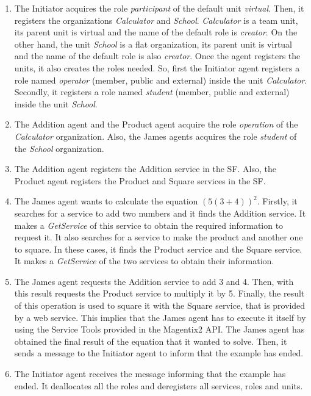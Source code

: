 \begin{enumerate}
 \item The Initiator acquires the role \textit{participant} of the default unit \textit{virtual}. Then, it registers the organizations \textit{Calculator} and \textit{School}. \textit{Calculator} is a team unit, its parent unit is virtual and the name of the default role is \textit{creator}. On the other hand, the unit \textit{School} is a flat organization, its parent unit is virtual and the name of the default role is also \textit{creator}. Once the agent registers the units, it also creates the roles needed. So, first the Initiator agent registers a role named \textit{operator} (member, public and external) inside the unit \textit{Calculator}. Secondly, it registers a role named \textit{student} (member, public and external) inside the unit \textit{School}.

 \item The Addition agent and the Product agent acquire the role \textit{operation} of the \textit{Calculator} organization. Also, the James agents acquires the role \textit{student} of the \textit{School} organization.

 \item The Addition agent registers the Addition service in the SF. Also, the Product agent registers the Product and Square services in the SF.

 \item The James agent wants to calculate the equation $(5 (3 + 4))^2$. Firstly, it searches for a service to add two numbers and it finds the Addition service. It makes a \textit{GetService} of this service to obtain the required information to request it. It also searches for a service to make the product and another one to square. In these cases, it finds the Product service and the Square service. It makes a \textit{GetService} of the two services to obtain their information.

 \item The James agent requests the Addition service to add 3 and 4. Then, with this result requests the Product service to multiply it by 5. Finally, the result of this operation is used to square it with the Square service, that is provided by a web service. This implies that the James agent has to execute it itself by using the Service Tools provided in the Magentix2 API. The James agent has obtained the final result of the equation that it wanted to solve. Then, it sends a message to the Initiator agent to inform that the example has ended.

 \item The Initiator agent receives the message informing that the example has ended. It deallocates all the roles and deregisters all services, roles and units.

\end{enumerate}

